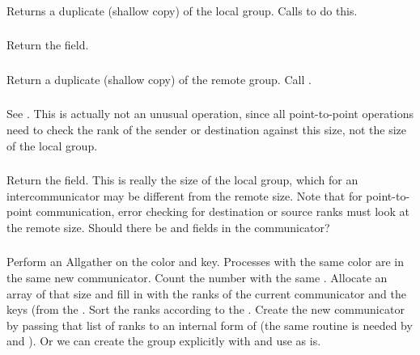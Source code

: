 \documentclass{article}
\begin{document}
\subsubsection{}
\begin{adi3}
  Returns a duplicate (shallow copy) of the local group.  Calls
   to do this. 
\end{adi3}

\subsubsection{}
Return the  field.

\subsubsection{}
\begin{adi3}
  Return a duplicate (shallow copy) of the remote group.  Call
  . 
\end{adi3}

\subsubsection{}
See .  This is actually not an unusual operation,
since all point-to-point operations need to check the rank of the
sender or destination against this size, not the size of the local
group.  

\subsubsection{}
Return the  field.  This is really the size of the local
group, which for an intercommunicator may be different from the remote
size.  Note that for point-to-point communication, error checking for
destination or source ranks must look at the remote size.  Should
there be  and  fields
in the communicator? 

\subsubsection{}
Perform an Allgather on the color and key.  Processes with the same color are
in the same new communicator.  Count the number with the same
.  Allocate an array of that size and fill in with the
ranks of the current communicator and the keys (from the
.  Sort the ranks according to the .
Create the new communicator by passing that list of ranks to an
internal form of  (the same routine is needed
by  and ).  Or
we can create the group explicitly with  and
use  as is.
\end{document}
